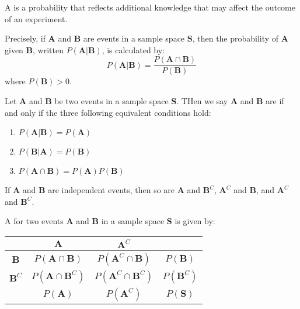 \documentclass[12pt]{report}
\begin{document}
\begin{defn}{}{}
    A  is a probability that reflects additional knowledge that may affect the outcome of an experiment.

    Precisely, if $\mathbf{A}$ and $\mathbf{B}$ are events in a sample space $\mathbf{S}$, then the probability of $\mathbf{A}$ given $\mathbf{B}$, written $P(\mathbf{A}\vert\mathbf{B})$, is calculated by:\begin{equation*}
        P(\mathbf{A}\vert\mathbf{B}) = \frac{P(\mathbf{A}\cap\mathbf{B})}{P(\mathbf{B})}
    \end{equation*}
    where $P(\mathbf{B}) > 0$.
\end{defn}

\begin{defn}{}{}
    Let $\mathbf{A}$ and $\mathbf{B}$ be two events in a sample space $\mathbf{S}$. THen we say $\mathbf{A}$ and $\mathbf{B}$ are  if and only if the three following equivalent conditions hold: \begin{enumerate}
        \item $P(\mathbf{A}\vert\mathbf{B}) = P(\mathbf{A})$
        \item $P(\mathbf{B}\vert\mathbf{A}) = P(\mathbf{B})$
        \item $P(\mathbf{A}\cap\mathbf{B}) = P(\mathbf{A})P(\mathbf{B})$
    \end{enumerate}
\end{defn}

\begin{prop}{}{}
    If $\mathbf{A}$ and $\mathbf{B}$ are independent events, then so are $\mathbf{A}$ and $\mathbf{B}^C$, $\mathbf{A}^C$ and $\mathbf{B}$, and $\mathbf{A}^C$ and $\mathbf{B}^C$.
\end{prop}


\begin{defn}{}{}
    A  for two events $\mathbf{A}$ and $\mathbf{B}$ in a sample space $\mathbf{S}$ is given by:
    \begin{table}[H]
		\centering
		\begin{tabular}{c||c|c||c}
			& $\mathbf{A}$ & $\mathbf{A}^C$ & \\\hline\hline
            $\mathbf{B}$ & $P(\mathbf{A}\cap\mathbf{B})$ & $P(\mathbf{A}^C\cap\mathbf{B})$ & $P(\mathbf{B})$ \\\hline
            $\mathbf{B}^C$ & $P(\mathbf{A}\cap\mathbf{B}^C)$ & $P(\mathbf{A}^C\cap\mathbf{B}^C)$ & $P(\mathbf{B}^C)$ \\\hline\hline
            & $P(\mathbf{A})$ & $P(\mathbf{A}^C)$ & $P(\mathbf{S})$
		\end{tabular}
	\end{table}
\end{defn}
\end{document}
